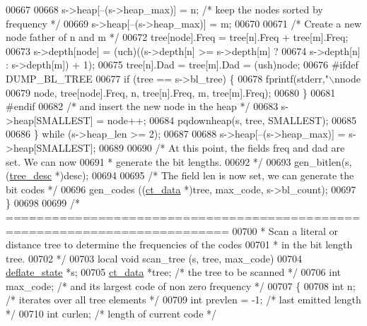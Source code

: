 \begin{DoxyCode}
{{{{{{{{{{{{00667 
00668         s->heap[--(s->heap\_max)] = n; \textcolor{comment}{/* keep the nodes sorted by frequency */}
00669         s->heap[--(s->heap\_max)] = m;
00670 
00671         \textcolor{comment}{/* Create a new node father of n and m */}
00672         tree[node].Freq = tree[n].Freq + tree[m].Freq;
00673         s->depth[node] = (uch)((s->depth[n] >= s->depth[m] ?
00674                                 s->depth[n] : s->depth[m]) + 1);
00675         tree[n].Dad = tree[m].Dad = (ush)node;
00676 \textcolor{preprocessor}{#ifdef DUMP\_BL\_TREE}
00677         \textcolor{keywordflow}{if} (tree == s->bl\_tree) \{
00678             fprintf(stderr,\textcolor{stringliteral}{"\(\backslash\)nnode %
00679                     node, tree[node].Freq, n, tree[n].Freq, m, tree[m].Freq);
00680         \}
00681 \textcolor{preprocessor}{#endif}
00682         \textcolor{comment}{/* and insert the new node in the heap */}
00683         s->heap[SMALLEST] = node++;
00684         pqdownheap(s, tree, SMALLEST);
00685 
00686     \} \textcolor{keywordflow}{while} (s->heap\_len >= 2);
00687 
00688     s->heap[--(s->heap\_max)] = s->heap[SMALLEST];
00689 
00690     \textcolor{comment}{/* At this point, the fields freq and dad are set. We can now}
00691 \textcolor{comment}{     * generate the bit lengths.}
00692 \textcolor{comment}{     */}
00693     gen\_bitlen(s, (\hyperlink{structtree__desc__s}{tree\_desc} *)desc);
00694 
00695     \textcolor{comment}{/* The field len is now set, we can generate the bit codes */}
00696     gen\_codes ((\hyperlink{structct__data__s}{ct\_data} *)tree, max\_code, s->bl\_count);
00697 \}
00698 
00699 \textcolor{comment}{/* ===========================================================================}
00700 \textcolor{comment}{ * Scan a literal or distance tree to determine the frequencies of the codes}
00701 \textcolor{comment}{ * in the bit length tree.}
00702 \textcolor{comment}{ */}
00703 local \textcolor{keywordtype}{void} scan\_tree (s, tree, max\_code)
00704     \hyperlink{structinternal__state}{deflate\_state} *s;
00705     \hyperlink{structct__data__s}{ct\_data} *tree;   \textcolor{comment}{/* the tree to be scanned */}
00706     \textcolor{keywordtype}{int} max\_code;    \textcolor{comment}{/* and its largest code of non zero frequency */}
00707 \{
00708     \textcolor{keywordtype}{int} n;                     \textcolor{comment}{/* iterates over all tree elements */}
00709     \textcolor{keywordtype}{int} prevlen = -1;          \textcolor{comment}{/* last emitted length */}
00710     \textcolor{keywordtype}{int} curlen;                \textcolor{comment}{/* length of current code */}
}}}}}}}}}}}}}
\end{DoxyCode}
